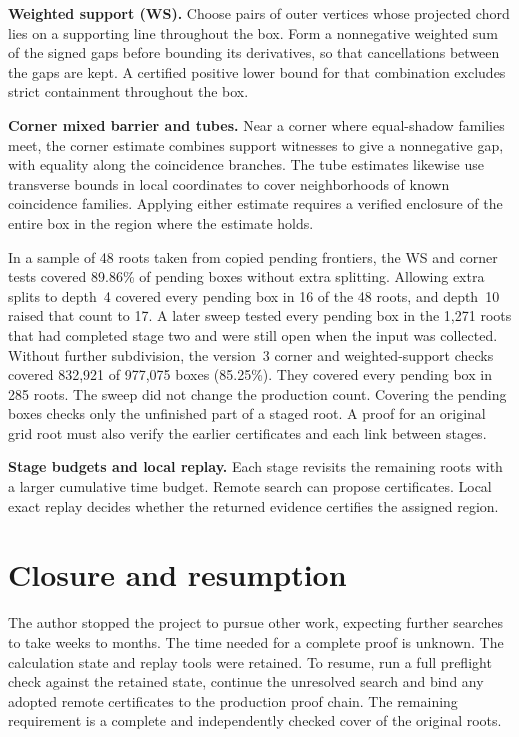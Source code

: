 \documentclass[11pt,a4paper]{amsart}
\begin{document}
\textbf{Weighted support (WS).} Choose pairs of outer vertices whose
projected chord lies on a supporting line throughout the box. Form a
nonnegative weighted sum of the signed gaps before bounding its
derivatives, so that cancellations between the gaps are kept. A certified positive lower bound for that
combination excludes strict containment throughout the box.

\textbf{Corner mixed barrier and tubes.} Near a corner where
equal-shadow families meet, the corner estimate combines support
witnesses to give a nonnegative gap, with equality along the coincidence
branches. The tube estimates likewise use transverse bounds in local
coordinates to cover neighborhoods of known coincidence families.
Applying either estimate requires a verified enclosure of the entire
box in the region where the estimate holds.

In a sample of 48 roots taken from copied pending frontiers, the WS
and corner tests covered 89.86\% of pending boxes without extra
splitting. Allowing extra splits to depth~4 covered every pending box
in 16 of the 48 roots, and depth~10 raised that count to 17. A later
sweep tested every pending box in the 1,271 roots that had completed
stage two and were still open when the input was collected. Without
further subdivision, the version~3 corner and weighted-support checks
covered 832,921 of 977,075 boxes (85.25\%). They covered every pending
box in 285 roots. The sweep did not change the production count.
Covering the pending boxes checks only the unfinished part of a staged
root. A proof for an original grid root must also verify the earlier
certificates and each link between stages.

\textbf{Stage budgets and local replay.} Each stage revisits the
remaining roots with a larger cumulative time budget.
Remote search can propose certificates. Local exact replay decides
whether the returned evidence certifies the assigned region.

\section*{Closure and resumption}

The author stopped the project to pursue other work, expecting further
searches to take weeks to months. The time needed for a complete proof
is unknown. The calculation
state and replay tools were retained. To resume, run a full preflight
check against the retained state, continue the unresolved search and
bind any adopted remote certificates to the production proof chain.
The remaining requirement is a complete and independently checked
cover of the original roots.
\end{document}
